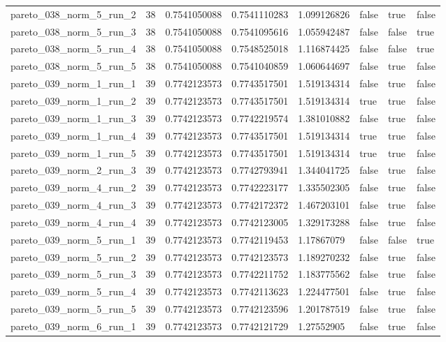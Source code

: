 \begin{tabular}{@{}llllllll@{}}
pareto\_038\_norm\_5\_run\_2 & 38 & 0.7541050088 & 0.7541110283 & 1.099126826 & false & true & false \\
pareto\_038\_norm\_5\_run\_3 & 38 & 0.7541050088 & 0.7541095616 & 1.055942487 & false & false & true \\
pareto\_038\_norm\_5\_run\_4 & 38 & 0.7541050088 & 0.7548525018 & 1.116874425 & false & false & true \\
pareto\_038\_norm\_5\_run\_5 & 38 & 0.7541050088 & 0.7541040859 & 1.060644697 & false & true & false \\
pareto\_039\_norm\_1\_run\_1 & 39 & 0.7742123573 & 0.7743517501 & 1.519134314 & false & true & false \\
pareto\_039\_norm\_1\_run\_2 & 39 & 0.7742123573 & 0.7743517501 & 1.519134314 & true & true & false \\
pareto\_039\_norm\_1\_run\_3 & 39 & 0.7742123573 & 0.7742219574 & 1.381010882 & false & true & false \\
pareto\_039\_norm\_1\_run\_4 & 39 & 0.7742123573 & 0.7743517501 & 1.519134314 & true & true & false \\
pareto\_039\_norm\_1\_run\_5 & 39 & 0.7742123573 & 0.7743517501 & 1.519134314 & true & true & false \\
pareto\_039\_norm\_2\_run\_3 & 39 & 0.7742123573 & 0.7742793941 & 1.344041725 & false & true & false \\
pareto\_039\_norm\_4\_run\_2 & 39 & 0.7742123573 & 0.7742223177 & 1.335502305 & false & true & false \\
pareto\_039\_norm\_4\_run\_3 & 39 & 0.7742123573 & 0.7742172372 & 1.467203101 & false & true & false \\
pareto\_039\_norm\_4\_run\_4 & 39 & 0.7742123573 & 0.7742123005 & 1.329173288 & false & true & false \\
pareto\_039\_norm\_5\_run\_1 & 39 & 0.7742123573 & 0.7742119453 & 1.17867079 & false & false & true \\
pareto\_039\_norm\_5\_run\_2 & 39 & 0.7742123573 & 0.7742123573 & 1.189270232 & false & true & false \\
pareto\_039\_norm\_5\_run\_3 & 39 & 0.7742123573 & 0.7742211752 & 1.183775562 & false & true & false \\
pareto\_039\_norm\_5\_run\_4 & 39 & 0.7742123573 & 0.7742113623 & 1.224477501 & false & true & false \\
pareto\_039\_norm\_5\_run\_5 & 39 & 0.7742123573 & 0.7742123596 & 1.201787519 & false & true & false \\
pareto\_039\_norm\_6\_run\_1 & 39 & 0.7742123573 & 0.7742121729 & 1.27552905 & false & true & false \\

\end{tabular}
